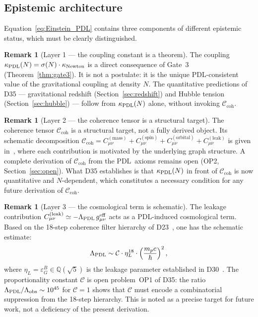 \documentclass[11pt,a4paper]{article}
\theoremstyle{definition}
\newtheorem{remark}[theorem]{Remark}
\newcommand{\PDL}{\textnormal{PDL}}
\newcommand{\hb}{\hbar}
\newcommand{\sig}{\sigma}
\newcommand{\kPDL}{\kappa_{\PDL}}
\newcommand{\Ccoh}{\mathcal{C}_{\mathrm{coh}}}
\newcommand{\geff}{g^{\mathrm{eff}}_{\mu\nu}}
\begin{document}
\subsection{Epistemic architecture}

Equation~\eqref{eq:Einstein_PDL} contains three components of different epistemic status, which must be clearly distinguished.

\begin{remark}[Layer 1 --- the coupling constant is a theorem]
\label{rem:layer1}
The coupling $\kPDL(N) = \sig(N)\cdot\kappa_{\mathrm{Newton}}$ is a direct consequence of Gate~3 (Theorem~\ref{thm:gate3}). It is not a postulate: it is the unique \PDL-consistent value of the gravitational coupling at density $N$. The quantitative predictions of D35 --- gravitational redshift (Section~\ref{sec:redshift}) and Hubble tension (Section~\ref{sec:hubble}) --- follow from $\kPDL(N)$ alone, without invoking $\Ccoh$.
\end{remark}

\begin{remark}[Layer 2 --- the coherence tensor is a structural target]
\label{rem:layer2}
The coherence tensor $\Ccoh$ is a structural target, not a fully derived object. Its schematic decomposition $\Ccoh = C_{\mu\nu}^{(\mathrm{mass})} + C_{\mu\nu}^{(\mathrm{spin})} + C_{\mu\nu}^{(\mathrm{orbital})} + C_{\mu\nu}^{(\mathrm{leak})}$ is given in~\cite{Einstein_Dirac_PDL_2026}, where each contribution is motivated by the underlying graph structure. A complete derivation of $\Ccoh$ from the \PDL\ axioms remains open (OP2, Section~\ref{sec:open}). What D35 establishes is that $\kPDL(N)$ in front of $\Ccoh$ is now quantitative and $N$-dependent, which constitutes a necessary condition for any future derivation of $\Ccoh$.
\end{remark}

\begin{remark}[Layer 3 --- the cosmological term is schematic]
\label{rem:lambda}
The leakage contribution $C_{\mu\nu}^{(\mathrm{leak})} \simeq -\Lambda_{\PDL}\,\geff$ acts as a \PDL-induced cosmological term. Based on the 18-step coherence filter hierarchy of D23~\cite{Topology_18_PDL_2026}, one has the schematic estimate:
\begin{equation}
\Lambda_{\PDL} \sim \mathcal{C}\cdot\eta_L^{18}\cdot\left(\frac{m_p c}{\hb}\right)^2,
\label{eq:Lambda}
\end{equation}
where $\eta_L = \varepsilon_G^B \in \mathbb{Q}(\sqrt{5})$ is the leakage parameter established in D30~\cite{PDL_D30_2026}. The proportionality constant $\mathcal{C}$ is open problem~OP1 of D35: the ratio $\Lambda_{\PDL}/\Lambda_{\mathrm{obs}} \sim 10^{45}$ for $\mathcal{C} = 1$ shows that $\mathcal{C}$ must encode a combinatorial suppression from the 18-step hierarchy. This is noted as a precise target for future work, not a deficiency of the present derivation.
\end{remark}
\end{document}
